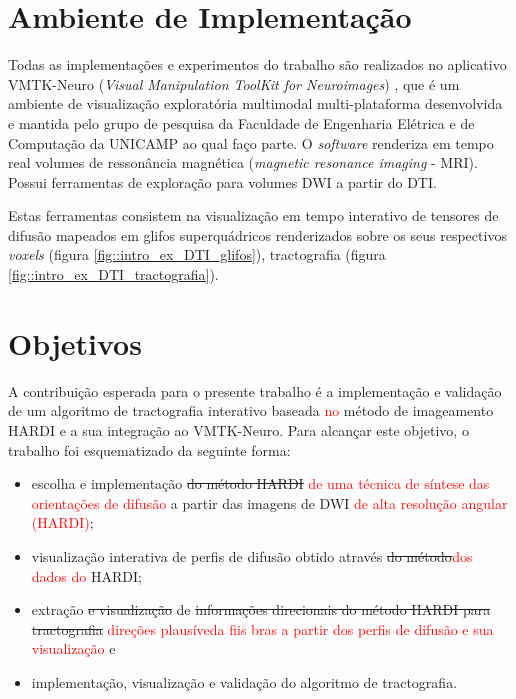 \documentclass[
    12pt,                %
    oneside,            %
    a4paper,            %
    english,            %
    french,                %
    spanish,            %
    brazil                %
    ]{abntex2}
\begin{document}
\section{Ambiente de Implementação}
\label{ssec:ambiente}

Todas as implementações e experimentos do trabalho são realizados no aplicativo VMTK-Neuro (\textit{Visual Manipulation ToolKit for Neuroimages}) \cite{VMTKNeuro}, que é um ambiente de visualização exploratória multimodal multi-plataforma desenvolvida e mantida pelo grupo de pesquisa da Faculdade de Engenharia Elétrica e de Computação da UNICAMP ao qual faço parte. O \textit{software} renderiza em tempo real volumes de ressonância magnética (\textit{magnetic resonance imaging} - MRI). Possui ferramentas de exploração para volumes DWI a partir do DTI.%

Estas ferramentas consistem na visualização em tempo interativo de tensores de difusão mapeados em glifos superquádricos renderizados sobre os seus respectivos \textit{voxels} (figura \ref{fig::intro_ex_DTI_glifos}), tractografia (figura \ref{fig::intro_ex_DTI_tractografia}).

\section{Objetivos}
\label{sec::objetivos}

A contribuição esperada para o presente trabalho é a implementação e validação de um algoritmo de tractografia interativo baseada \textcolor{red}{no} método de imageamento HARDI e a sua integração ao VMTK-Neuro. Para alcançar este objetivo, o trabalho foi esquematizado da seguinte forma:

\begin{itemize}
\item escolha e implementação \sout{do método HARDI} \textcolor{red}{de uma técnica de síntese das orientações de difusão} a partir das imagens de DWI \textcolor{red}{de alta resolução angular (HARDI)};
\item visualização interativa de perfis de difusão obtido através \sout{do método}\textcolor{red}{dos dados do} HARDI;
\item extração \sout{e visualização} de \sout{informações direcionais do método HARDI para tractografia} \textcolor{red}{direções plausíveda fiis bras a partir dos perfis de difusão e sua visualização} e
\item implementação, visualização e validação do algoritmo de tractografia.
\end{itemize}
\end{document}
